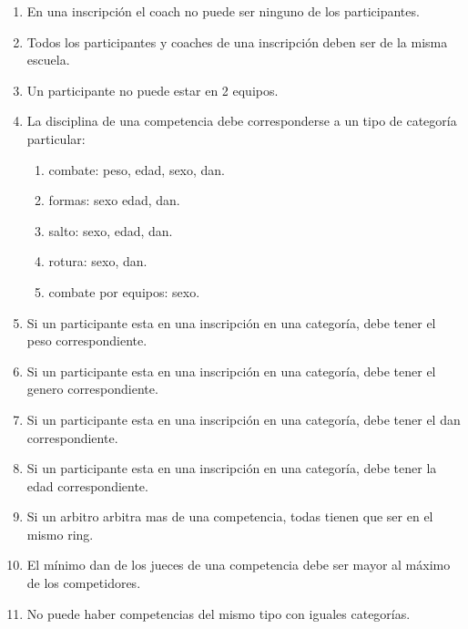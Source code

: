 \begin{enumerate}
  \item En una inscripción el coach no puede ser ninguno de los participantes.
  \item Todos los participantes y coaches de una inscripción deben ser de la misma escuela.
  \item Un participante no puede estar en 2 equipos.
  \item La disciplina de una competencia debe corresponderse a un tipo de categoría particular: \begin{enumerate}
    \item combate: peso, edad, sexo, dan.
    \item formas: sexo edad, dan.
    \item salto: sexo, edad, dan.
    \item rotura: sexo, dan.
    \item combate por equipos: sexo. \end{enumerate}
  \item Si un participante esta en una inscripción en una categoría, debe tener el peso correspondiente.
  \item Si un participante esta en una inscripción en una categoría, debe tener el genero correspondiente.
  \item Si un participante esta en una inscripción en una categoría, debe tener el dan correspondiente.
  \item Si un participante esta en una inscripción en una categoría, debe tener la edad correspondiente.
  \item Si un arbitro arbitra mas de una competencia, todas tienen que ser en el mismo ring.
  \item El mínimo dan de los jueces de una competencia debe ser mayor al máximo de los competidores.
  \item No puede haber competencias del mismo tipo con iguales categorías.
\end{enumerate}

